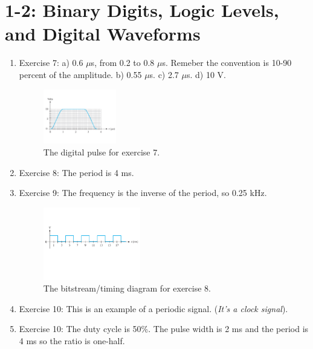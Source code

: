 \documentclass[10pt]{article}
\begin{document}
\maketitle

\section{1-2: Binary Digits, Logic Levels, and Digital Waveforms}

\begin{enumerate}
\item Exercise 7: a) 0.6 $\mu$s, from 0.2 to 0.8 $\mu$s.  Remeber the convention is 10-90 percent of the amplitude. b) 0.55 $\mu$s.  c) 2.7 $\mu$s.  d) 10 V.
\begin{figure}[ht]
\centering
\includegraphics[width=0.3\textwidth,trim=0cm 2cm 0cm 2cm,clip=true]{logicPulse1.pdf}
\caption{\label{fig:logicPulse1} The digital pulse for exercise 7.}
\end{figure}
\item Exercise 8: The period is 4 ms.
\item Exercise 9: The frequency is the inverse of the period, so 0.25 kHz.
\begin{figure}[ht]
\centering
\includegraphics[width=0.4\textwidth,trim=0cm 6cm 0cm 6cm,clip=true]{logicPulse2.pdf}
\caption{\label{fig:logicPulse2} The bitstream/timing diagram for exercise 8.}
\end{figure}
\item Exercise 10: This is an example of a periodic signal.  (\textit{It's a clock signal}).
\item Exercise 10: The duty cycle is 50\%.  The pulse width is 2 ms and the period is 4 ms so the ratio is one-half.
\end{enumerate}
\end{document}

